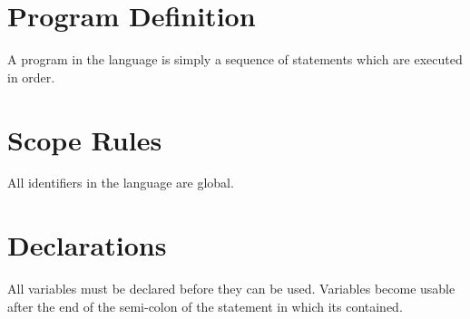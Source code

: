 \section{Program Definition}
A program in the \sys{} language is simply a sequence of statements which
are executed in order.

\section{Scope Rules}
All identifiers in the \sys{} language are global.

\section{Declarations}
All variables must be declared before they can be used.
Variables become usable after the end of the semi-colon of the statement
in which its contained.